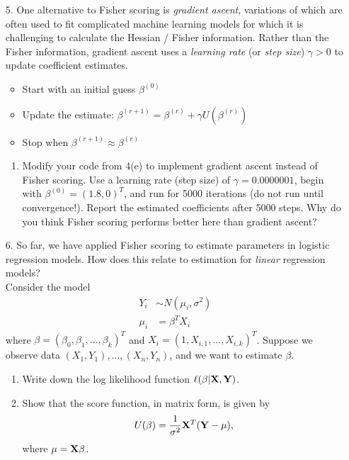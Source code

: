 \documentclass[11pt]{article}
\begin{document}
\begin{enumerate}
\begin{enumerate}
\end{enumerate}

\item[5.] One alternative to Fisher scoring is \textit{gradient ascent}, variations of which are often used to fit complicated machine learning models for which it is challenging to calculate the Hessian / Fisher information. Rather than the Fisher information, gradient ascent uses a \textit{learning rate} (or \textit{step size}) $\gamma > 0$ to update coefficient estimates. 

\begin{itemize}
\item Start with an initial guess $\beta^{(0)}$
\item Update the estimate: $\beta^{(r+1)} = \beta^{(r)} + \gamma U(\beta^{(r)})$
\item Stop when $\beta^{(r+1)} \approx \beta^{(r)}$
\end{itemize}

\begin{enumerate}
\item Modify your code from 4(e) to implement gradient ascent instead of Fisher scoring. Use a learning rate (step size) of $\gamma = 0.0000001$, begin with $\beta^{(0)} = (1.8, 0)^T$, and run for 5000 iterations (do not run until convergence!). Report the estimated coefficients after 5000 steps. Why do you think Fisher scoring performs better here than gradient ascent?
\end{enumerate}

\item[6.] So far, we have applied Fisher scoring to estimate parameters in logistic regression models. How does this relate to estimation for \textit{linear} regression models?\\

Consider the model
\begin{align*}
Y_i &\sim N(\mu_i, \sigma^2) \\
\mu_i &= \beta^T X_i
\end{align*}
where $\beta = (\beta_0, \beta_1, ..., \beta_k)^T$ and $X_i = (1, X_{i,1},...,X_{i,k})^T$. Suppose we observe data $(X_1,Y_1),...,(X_n,Y_n)$, and we want to estimate $\beta$.

\begin{enumerate}
\item Write down the log likelihood function $\ell(\beta | {\bf X}, {\bf Y})$.

\item Show that the score function, in matrix form, is given by
$$U(\beta) = \frac{1}{\sigma^2} {\bf X}^T ({\bf Y} - \mu),$$
where $\mu = {\bf X} \beta$.


\end{enumerate}
\end{enumerate}
\end{document}
